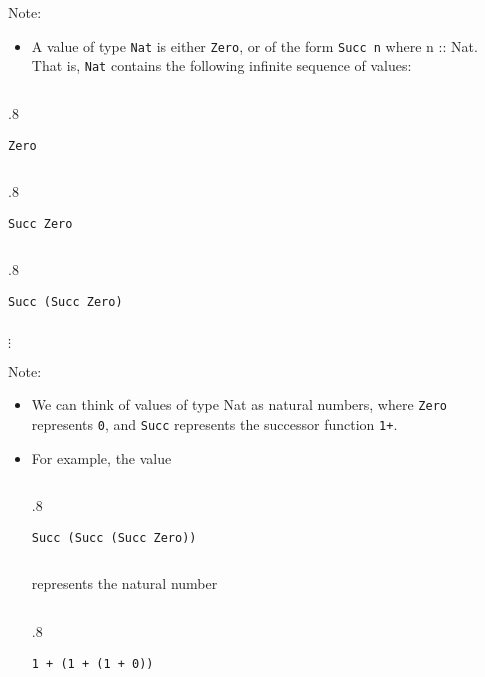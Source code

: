 \documentclass{beamer}
\newenvironment{execblock}[1][.8]{%
\begin{columns}
\begin{column}{#1\linewidth}
\begin{block}{}}{%
\end{block}
\end{column}
\end{columns}}
\begin{document}
\begin{frame}[fragile]
\LARGE

Note: 
\begin{itemize}
\item A value of type {\tt Nat} is either {\tt Zero}, or of the form 
{\tt Succ n} where {n :: Nat}.  That is, {\tt Nat} contains the 
following infinite sequence of values: 
\end{itemize}

\begin{execblock}
\begin{verbatim}
Zero
\end{verbatim}
\end{execblock}
\begin{execblock}
\begin{verbatim}
Succ Zero
\end{verbatim}
\end{execblock}
\begin{execblock}
\begin{verbatim}
Succ (Succ Zero)
\end{verbatim}
\end{execblock}

\hskip 1in {\Huge$\vdots$}

\end{frame}


\begin{frame}[fragile]
\LARGE

Note: 
\begin{itemize}
\item We can think of values of type Nat as natural 
numbers, where {\tt Zero} represents {\tt 0}, and {\tt Succ} 
represents the successor function {\tt 1+}. 
\item For example, the value
\begin{execblock}
\begin{verbatim}
Succ (Succ (Succ Zero))
\end{verbatim}
\end{execblock}

represents the natural number
\begin{execblock}
\begin{verbatim}
1 + (1 + (1 + 0))
\end{verbatim}
\end{execblock}

\end{itemize}

\end{frame}
\end{document}
